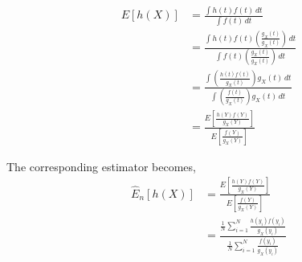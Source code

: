 \begin{equation*} \label{eq:unnormalized}
\begin{split}
E[h(X)] & = \frac{\int h(t)f(t)\,dt}{\int f(t)\,dt} \\
& = \frac{\int h(t)f(t) \left ( \frac{g_X(t)}{g_X(t)} \right )\,dt}{{\int f(t)} \left ( \frac{g_X(t)}{g_X(t)} \right )\,dt} \\
& = \frac{\int \left ( \frac{h(t)f(t)}{g_X(t)} \right ) g_X(t)\,dt}{\int \left ( \frac{f(t)}{g_X(t)} \right ) g_X(t)\,dt} \\
& = \frac{E\left [ \frac{h(Y)f(Y)}{g_X(Y)}\right ]}{E\left [ \frac{f(Y)}{g_X(Y)}\right ]}
\end{split}
\end{equation*}

The corresponding estimator becomes,
\begin{equation*}
\begin{split}
\widehat{E}_n[h(X)] & = \frac{E\left [ \frac{h(Y)f(Y)}{g_X(Y)}\right ]}{E\left [ \frac{f(Y)}{g_X(Y)}\right ]} \\
& = \frac{\frac{1}{N}\sum_{i = 1}^{N}\frac{h(y_i)f(y_i)}{g_X(y_i)}}{\frac{1}{N}\sum_{i = 1}^{N}\frac{f(y_i)}{g_X(y_i)}} \\
\end{split}
\end{equation*}
